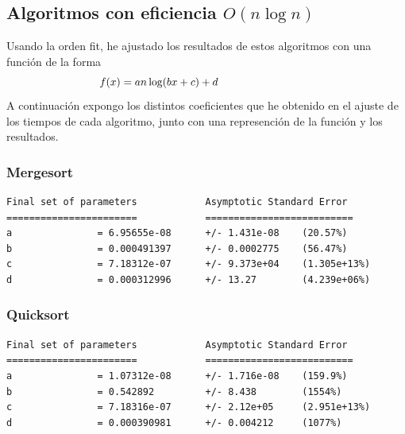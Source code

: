\documentclass[a4]{article}
\begin{document}
\subsection{Algoritmos con eficiencia $O(n\log n)$}

\begin{flushleft}
  Usando la orden fit, he ajustado los resultados de estos algoritmos
  con una función de la forma \[\hspace{-30mm}f(x)=an\log(bx+c)+d\] A
  continuación expongo los distintos coeficientes que he obtenido en
  el ajuste de los tiempos de cada algoritmo, junto con una
  represención de la función y los resultados.
\end{flushleft}

\subsubsection{Mergesort}

\begin{verbatim}
Final set of parameters            Asymptotic Standard Error
=======================            ==========================
a               = 6.95655e-08      +/- 1.431e-08    (20.57%)
b               = 0.000491397      +/- 0.0002775    (56.47%)
c               = 7.18312e-07      +/- 9.373e+04    (1.305e+13%)
d               = 0.000312996      +/- 13.27        (4.239e+06%)
\end{verbatim}

\begin{figure}[H]
  \centering
\end{figure}

\subsubsection{Quicksort}

\begin{verbatim}
Final set of parameters            Asymptotic Standard Error
=======================            ==========================
a               = 1.07312e-08      +/- 1.716e-08    (159.9%)
b               = 0.542892         +/- 8.438        (1554%)
c               = 7.18316e-07      +/- 2.12e+05     (2.951e+13%)
d               = 0.000390981      +/- 0.004212     (1077%)
\end{verbatim}
\end{document}
